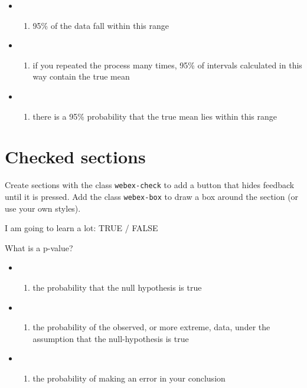 \documentclass[
  letterpaper,
  DIV=11,
  numbers=noendperiod]{scrreprt}
\providecommand{\tightlist}{%
  \setlength{\itemsep}{0pt}\setlength{\parskip}{0pt}}\usepackage{longtable,booktabs,array}
\begin{document}
\begin{itemize}
\tightlist
\item
  \begin{enumerate}
  \def\labelenumi{(\Alph{enumi})}
  \tightlist
  \item
    95\% of the data fall within this range\\
  \end{enumerate}
\item
  \begin{enumerate}
  \def\labelenumi{(\Alph{enumi})}
  \setcounter{enumi}{1}
  \tightlist
  \item
    if you repeated the process many times, 95\% of intervals calculated
    in this way contain the true mean\\
  \end{enumerate}
\item
  \begin{enumerate}
  \def\labelenumi{(\Alph{enumi})}
  \setcounter{enumi}{2}
  \tightlist
  \item
    there is a 95\% probability that the true mean lies within this
    range
  \end{enumerate}
\end{itemize}

\section{Checked sections}\label{checked-sections}

Create sections with the class \texttt{webex-check} to add a button that
hides feedback until it is pressed. Add the class \texttt{webex-box} to
draw a box around the section (or use your own styles).

I am going to learn a lot: TRUE / FALSE

What is a p-value?

\begin{itemize}
\tightlist
\item
  \begin{enumerate}
  \def\labelenumi{(\Alph{enumi})}
  \tightlist
  \item
    the probability that the null hypothesis is true\\
  \end{enumerate}
\item
  \begin{enumerate}
  \def\labelenumi{(\Alph{enumi})}
  \setcounter{enumi}{1}
  \tightlist
  \item
    the probability of the observed, or more extreme, data, under the
    assumption that the null-hypothesis is true\\
  \end{enumerate}
\item
  \begin{enumerate}
  \def\labelenumi{(\Alph{enumi})}
  \setcounter{enumi}{2}
  \tightlist
  \item
    the probability of making an error in your conclusion
  \end{enumerate}
\end{itemize}
\end{document}
